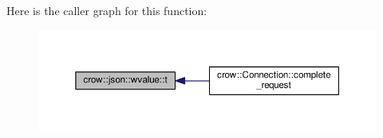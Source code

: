 Here is the caller graph for this function\-:
\nopagebreak
\begin{figure}[H]
\begin{center}
\leavevmode
\includegraphics[width=350pt]{classcrow_1_1json_1_1wvalue_ae92eda8ed30f6360b46bf9f4f30074ec_icgraph}
\end{center}
\end{figure}





